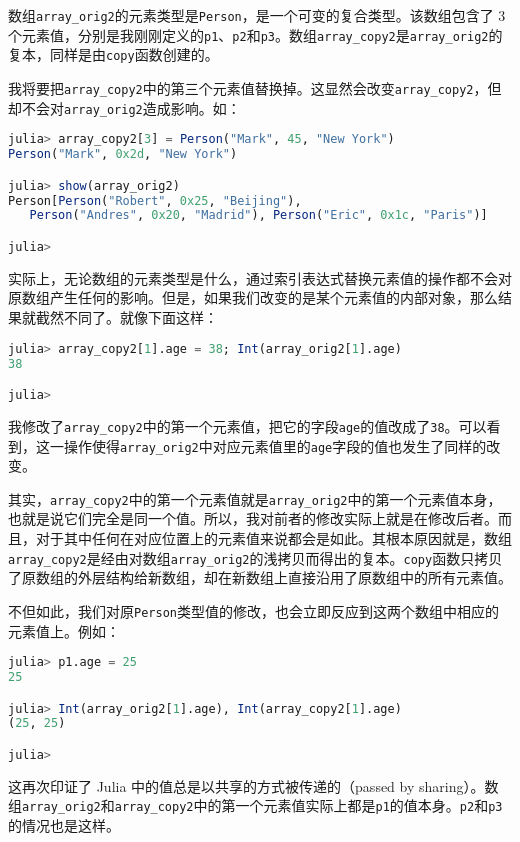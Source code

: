 数组\verb|array_orig2|的元素类型是\verb|Person|，是一个可变的复合类型。该数组包含了 3 个元素值，分别是我刚刚定义的\verb|p1|、\verb|p2|和\verb|p3|。数组\verb|array_copy2|是\verb|array_orig2|的复本，同样是由\verb|copy|函数创建的。

我将要把\verb|array_copy2|中的第三个元素值替换掉。这显然会改变\verb|array_copy2|，但却不会对\verb|array_orig2|造成影响。如：

\begin{lstlisting}[language=julia]
julia> array_copy2[3] = Person("Mark", 45, "New York")
Person("Mark", 0x2d, "New York")

julia> show(array_orig2)
Person[Person("Robert", 0x25, "Beijing"),
   Person("Andres", 0x20, "Madrid"), Person("Eric", 0x1c, "Paris")]

julia> 
\end{lstlisting}

实际上，无论数组的元素类型是什么，通过索引表达式替换元素值的操作都不会对原数组产生任何的影响。但是，如果我们改变的是某个元素值的内部对象，那么结果就截然不同了。就像下面这样：

\begin{lstlisting}[language=julia]
julia> array_copy2[1].age = 38; Int(array_orig2[1].age)
38

julia> 
\end{lstlisting}

我修改了\verb|array_copy2|中的第一个元素值，把它的字段\verb|age|的值改成了\verb|38|。可以看到，这一操作使得\verb|array_orig2|中对应元素值里的\verb|age|字段的值也发生了同样的改变。

其实，\verb|array_copy2|中的第一个元素值就是\verb|array_orig2|中的第一个元素值本身，也就是说它们完全是同一个值。所以，我对前者的修改实际上就是在修改后者。而且，对于其中任何在对应位置上的元素值来说都会是如此。其根本原因就是，数组\verb|array_copy2|是经由对数组\verb|array_orig2|的浅拷贝而得出的复本。\verb|copy|函数只拷贝了原数组的外层结构给新数组，却在新数组上直接沿用了原数组中的所有元素值。

不但如此，我们对原\verb|Person|类型值的修改，也会立即反应到这两个数组中相应的元素值上。例如：

\begin{lstlisting}[language=julia]
julia> p1.age = 25
25

julia> Int(array_orig2[1].age), Int(array_copy2[1].age)
(25, 25)

julia> 
\end{lstlisting}

这再次印证了 Julia 中的值总是以共享的方式被传递的（passed by sharing）。数组\verb|array_orig2|和\verb|array_copy2|中的第一个元素值实际上都是\verb|p1|的值本身。\verb|p2|和\verb|p3|的情况也是这样。

